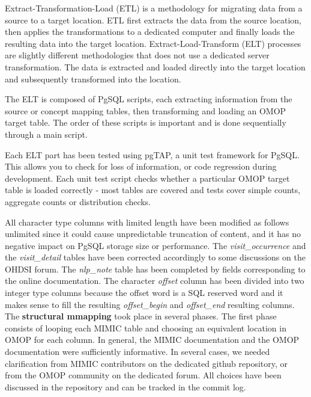 Extract-Transformation-Load (ETL) is a methodology for migrating data from a 
source to a target location. ETL first extracts the data from the source location, 
then applies the transformations to a dedicated computer and finally loads the 
resulting data into the target location. Extract-Load-Transform (ELT) processes 
are slightly different methodologies that does not use a dedicated server 
transformation. The data is extracted and loaded directly into the target location 
and subsequently transformed into the location.

The ELT is composed of PgSQL scripts, each extracting information from the source 
or concept mapping tables, then transforming and loading an OMOP target table. 
The order of these scripts is important and is done sequentially through a main 
script.

Each ELT part has been tested using pgTAP, a unit test framework for PgSQL. This 
allows you to check for loss of information, or code regression during development. 
Each unit test script checks whether a particular OMOP target table is loaded 
correctly - most tables are covered and tests cover simple counts, aggregate counts 
or distribution checks.

All character type columns with limited length have been modified as follows
unlimited since it could cause unpredictable truncation of content, and it has
no negative impact on PgSQL storage size or performance. The
\textit{visit\_occurrence} and the \textit{visit\_detail} tables have been
corrected accordingly to some discussions on the OHDSI forum. 
The \textit{nlp\_note} table has been completed by fields corresponding to 
the online documentation. The character \textit{offset} column has been divided into two 
integer type columns because the offset word is a SQL reserved word and it makes 
sense to fill the resulting \textit{offset\_begin} and \textit{offset\_end} 
resulting columns.
\\

The \textbf{structural mmapping} took place in several phases.
The first phase consists of looping each MIMIC table and choosing an equivalent 
location in OMOP for each column. In general, the MIMIC documentation and the OMOP 
documentation were sufficiently informative. In several cases, we needed 
clarification from MIMIC contributors on the dedicated github repository, or from 
the OMOP community on the dedicated forum. All choices have been discussed in the 
repository \cite{mimic-omop-github} and can be tracked in the commit log.

